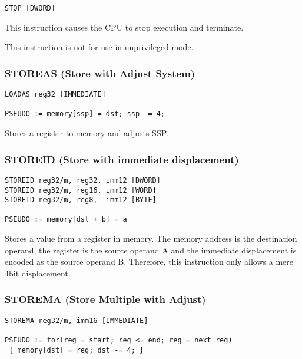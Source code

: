 \begin{verbatim}
STOP [DWORD]
\end{verbatim}


This instruction causes the CPU to stop execution and terminate. 


This instruction is not for use in unprivileged mode.

\subsubsection{STOREAS (Store with Adjust System)}

\begin{verbatim}
LOADAS reg32 [IMMEDIATE]

PSEUDO := memory[ssp] = dst; ssp -= 4;
\end{verbatim}


Stores a register to memory and adjusts SSP.

\subsubsection{STOREID (Store with immediate displacement)}

\begin{verbatim}
STOREID reg32/m, reg32, imm12 [DWORD]
STOREID reg32/m, reg16, imm12 [WORD]
STOREID reg32/m, reg8,  imm12 [BYTE]

PSEUDO := memory[dst + b] = a
\end{verbatim}


Stores a value from a register in memory. The memory address is the destination operand, the register is the source operand A and
the immediate displacement is encoded as the source operand B. Therefore, this instruction only allows a mere 4bit displacement. 

\subsubsection{STOREMA (Store Multiple with Adjust)}

\begin{verbatim}
STOREMA reg32/m, imm16 [IMMEDIATE]

PSEUDO := for(reg = start; reg <= end; reg = next_reg)
 { memory[dst] = reg; dst -= 4; }
\end{verbatim}

